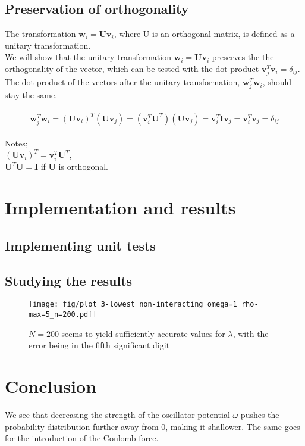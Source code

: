 \documentclass[a4paper]{article}
\begin{document}
\subsection{Preservation of orthogonality}

The transformation $\textbf{w}_i = \textbf{U}\textbf{v}_i$, where U is an orthogonal matrix, is defined as a unitary transformation.
\\
We will show that the unitary transformation $\textbf{w}_i = \textbf{U}\textbf{v}_i$ preserves the the orthogonality of the vector, which can be tested with the dot product $\textbf{v}_j^T\textbf{v}_i = \delta_{ij}$. The dot product of the vectors after the unitary transformation, $\textbf{w}_j^T\textbf{w}_i$, should stay the same.\\
\\
\begin{equation}
\textbf{w}_j^T\textbf{w}_i = (\textbf{U}\textbf{v}_i)^T(\textbf{U}\textbf{v}_j) = (\textbf{v}_i^T\textbf{U}^T)(\textbf{U}\textbf{v}_j) = \textbf{v}_i^T\textbf{I}\textbf{v}_j = \textbf{v}_i^T\textbf{v}_j = \delta_{ij}
\end{equation}
\\
Notes;\\
$(\textbf{U}\textbf{v}_i)^T = \textbf{v}_i^T\textbf{U}^T$,\\
$\textbf{U}^T\textbf{U} = \textbf{I}$ if $\textbf{U}$ is orthogonal.

\section{Implementation and results}\label{sec:implementation_and_results}
\subsection{Implementing unit tests}

\subsection{Studying the results}
\begin{figure}[ht]
\texttt{[image: fig/plot\_3-lowest\_non-interacting\_omega=1\_rho-max=5\_n=200.pdf]}
\caption{$N=200$ seems to yield sufficiently accurate values for $\lambda$, with the error being in the fifth significant digit}
\end{figure}

\section{Conclusion}\label{sec:conclusion}
We see that decreasing the strength of the oscillator potential $\omega$ pushes the probability-distribution further away from 0, making it shallower. The same goes for the introduction of the Coulomb force.


%
%

{}
\end{document}
